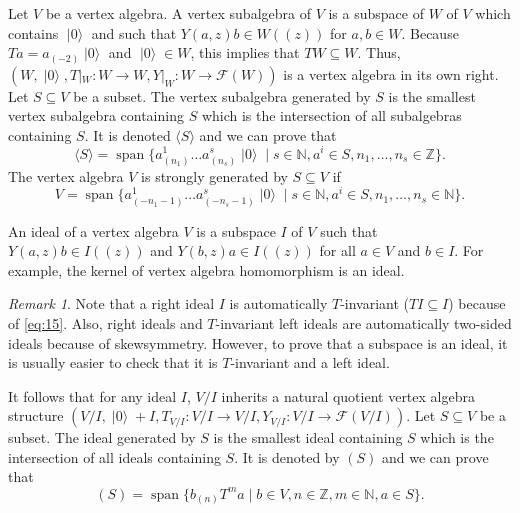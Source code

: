 \documentclass[a4paper, 12pt, reqno]{amsart}
\theoremstyle{remark}
\newtheorem{remark}[theorem]{Remark}
\numberwithin{equation}{subsection}
\DeclareMathOperator{\vspan}{span}
\DeclareMathOperator{\vac}{|0\rangle}
\begin{document}
Let $V$ be a vertex algebra.
A vertex subalgebra of $V$ is a subspace of $W$ of $V$ which contains $\vac$ and such that $Y(a, z)b \in W((z))$ for $a, b\in W$.
Because $Ta = a_{(-2)}\vac$ and $\vac\in W$, this implies that $TW \subseteq W$.
Thus, $(W, \vac, T|_{W}: W \to W, Y|_{W}: W \to \mathcal{F}(W))$ is a vertex algebra in its own right.
Let $S \subseteq V$ be a subset.
The vertex subalgebra generated by $S$ is the smallest vertex subalgebra containing $S$ which is the intersection of all subalgebras containing $S$.
It is denoted $\langle S \rangle$ and we can prove that
\begin{equation*}
  \langle S \rangle = \vspan \{a^1_{(n_1)}\dots a^s_{(n_s)}\vac \mid s \in \mathbb{N}, a^i \in S, n_1, \dots, n_s \in \mathbb{Z}\}.
\end{equation*}
The vertex algebra $V$ is strongly generated by $S \subseteq V$ if
\begin{equation*}
  V = \vspan \{a^1_{(-n_1 - 1)}\dots a^s_{(-n_s - 1)}\vac \mid s \in \mathbb{N}, a^i \in S, n_1, \dots, n_s \in \mathbb{N}\}.
\end{equation*}

An ideal of a vertex algebra $V$ is a subspace $I$ of $V$ such that $Y(a, z)b \in I((z))$ and $Y(b, z)a \in I((z))$ for all $a \in V$ and $b \in I$.
For example, the kernel of vertex algebra homomorphism is an ideal.

\begin{remark}
  \label{rmk:11}
  Note that a right ideal $I$ is automatically $T$-invariant ($TI \subseteq I$) because of \eqref{eq:15}.
  Also, right ideals and $T$-invariant left ideals are automatically two-sided ideals because of skewsymmetry.
  However, to prove that a subspace is an ideal, it is usually easier to check that it is $T$-invariant and a left ideal.
\end{remark}

It follows that for any ideal $I$, $V/I$ inherits a natural quotient vertex algebra structure $(V/I, \vac + I,T_{V/I}: V/I \to V/I, Y_{V/I}: V/I \to \mathcal{F}(V/I))$.
Let $S \subseteq V$ be a subset.
The ideal generated by $S$ is the smallest ideal containing $S$ which is the intersection of all ideals containing $S$.
It is denoted by $(S)$ and we can prove that
\begin{equation*}
  (S) = \vspan\{b_{(n)}T^ma \mid b \in V, n \in \mathbb{Z}, m \in \mathbb{N}, a \in S\}.
\end{equation*}
\end{document}
